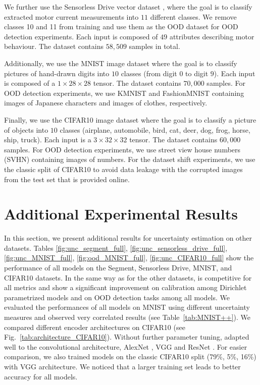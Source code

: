 We further use the Sensorless Drive vector dataset \cite{uci_datasets}, where the goal is to classify extracted motor current measurements into $11$ different classes. We remove classes 10 and 11 from training and use them as the OOD dataset for OOD detection experiments. Each input is composed of $49$ attributes describing motor behaviour. The dataset contains $58,509$ samples in total.

Additionally, we use the MNIST image dataset \cite{mnist} where the goal is to classify pictures of hand-drawn digits into $10$ classes (from digit $0$ to digit $9$). Each input is composed of a $1 \times 28 \times 28$ tensor. The dataset contains $70,000$ samples. For OOD detection experiments, we use KMNIST \cite{kmnist} and FashionMNIST \cite{fashionmnist} containing images of Japanese characters and images of clothes, respectively. 

Finally, we use the CIFAR10 image dataset \cite{cifar10} where the goal is to classify a picture of objects into $10$ classes (airplane, automobile, bird, cat, deer, dog, frog, horse, ship, truck). Each input is a $3 \times 32 \times 32$ tensor. The dataset contains $60,000$ samples. For OOD detection experiments, we use street view house numbers (SVHN) \cite{svhn} containing images of numbers. For the dataset shift experiments, we use the classic split of CIFAR10 to avoid data leakage with the corrupted images from the test set that is provided online.

\section{Additional Experimental Results}
\label{sec:app_additional_results}

In this section, we present additional results for uncertainty estimation on other datasets. Tables \ref{fig:unc_segment_full}, \ref{fig:unc_sensorless_drive_full}, \ref{fig:unc_MNIST_full}, \ref{fig:ood_MNIST_full}, \ref{fig:unc_CIFAR10_full} show the performance of all models on the Segment, Sensorless Drive, MNIST, and CIFAR10 datasets. In the same way as for the other datasets, \oursacro is competitive for all metrics and show a significant improvement on calibration among Dirichlet parametrized models and on OOD detection tasks among all models. We evaluated the performances of all models on MNIST using different uncertainty measures and observed very correlated results (see Table~\ref{tab:MNIST++}). We compared different encoder architectures on CIFAR10 (see Fig.~\ref{tab:architecture_CIFAR10}). Without further parameter tuning, \oursacro adapted well to the convolutional architecture, AlexNet \cite{alexnet}, VGG \cite{vgg} and ResNet \cite{resnet}. For easier comparison, we also trained models on the classic CIFAR10 split (79\%, 5\%, 16\%) with VGG architecture. We noticed that a larger training set leads to better accuracy for all models.

